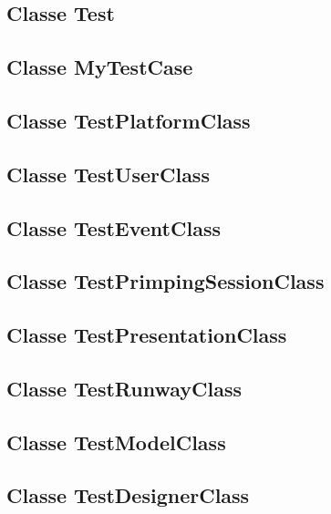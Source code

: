\documentclass{article}
\begin{document}
\subsection{Classe Test}


\subsection{Classe MyTestCase}


\subsection{Classe TestPlatformClass}


\subsection{Classe TestUserClass}


\subsection{Classe TestEventClass}


\subsection{Classe TestPrimpingSessionClass}


\subsection{Classe TestPresentationClass}


\subsection{Classe TestRunwayClass}


\subsection{Classe TestModelClass}


\subsection{Classe TestDesignerClass}

\end{document}
